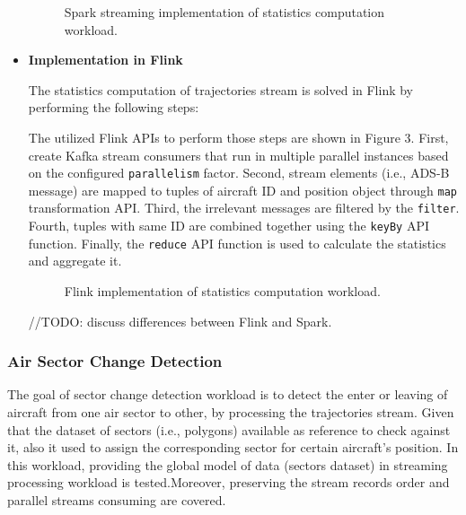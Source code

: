 \documentclass[]{article}
\begin{document}
\begin{itemize}
\begin{figure}[h]
 
  \centering
  
     \caption{Spark streaming implementation of statistics computation workload.}
\end{figure} 

\item {\bf{Implementation in Flink }}

The statistics computation of trajectories stream is solved in Flink by performing the following steps: 

\par The utilized Flink APIs to perform those steps are shown in Figure 3. First, create Kafka stream consumers that run in multiple parallel instances based on the configured \texttt{parallelism} factor. Second,  stream elements (i.e., ADS-B message) are mapped  to tuples of aircraft ID and  position object through \texttt{map} transformation API. Third, the irrelevant messages are filtered by the \texttt{filter}. Fourth, tuples with same ID are combined together using the \texttt{keyBy} API function. Finally, the \texttt{reduce} API function is used to calculate the statistics and aggregate it.

\begin{figure}[h]
 
  \centering
  
     \caption{Flink implementation of statistics computation workload.}
\end{figure}


//TODO: discuss differences between Flink and Spark.

\end{itemize}

\subsubsection{Air Sector Change Detection}

The goal of sector change detection workload is to detect the  enter or leaving of aircraft from one air sector to other, by processing the trajectories stream. Given that the dataset of sectors (i.e., polygons) available as reference to check against it, also it used to assign the corresponding sector for certain aircraft's position. In this workload, providing the  global model of data (sectors dataset) in streaming processing workload is tested.Moreover, preserving the stream records order and parallel streams consuming are covered.
 
\end{document}
